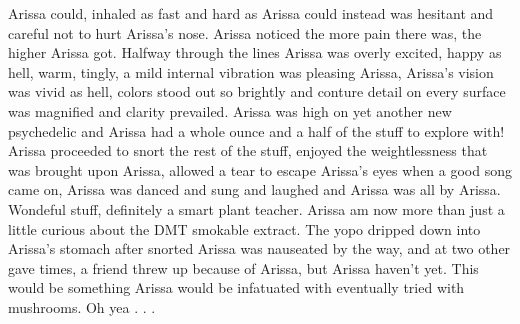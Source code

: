 \documentclass[12pt]{book}
\begin{document}
Arissa could, inhaled as fast and hard as Arissa could instead was hesitant and careful not to hurt Arissa's nose. Arissa noticed the more pain there was, the higher Arissa got. Halfway through the lines Arissa was overly excited, happy as hell, warm, tingly, a mild internal vibration was pleasing Arissa, Arissa's vision was vivid as hell, colors stood out so brightly and conture detail on every surface was magnified and clarity prevailed. Arissa was high on yet another new psychedelic and Arissa had a whole ounce and a half of the stuff to explore with! Arissa proceeded to snort the rest of the stuff, enjoyed the weightlessness that was brought upon Arissa, allowed a tear to escape Arissa's eyes when a good song came on, Arissa was danced and sung and laughed and Arissa was all by Arissa. Wondeful stuff, definitely a smart plant teacher. Arissa am now more than just a little curious about the DMT smokable extract. The yopo dripped down into Arissa's stomach after snorted Arissa was nauseated by the way, and at two other gave times, a friend threw up because of Arissa, but Arissa haven't yet. This would be something Arissa would be infatuated with eventually tried with mushrooms. Oh yea . . . 
\end{document}
